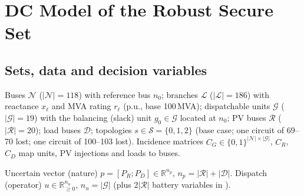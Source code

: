 
\section{DC Model of the Robust Secure Set}
\label{app:dc}

\subsection{Sets, data and decision variables}
Buses $\mathcal N$ ($|\mathcal N|=118$) with reference bus $n_0$; branches $\mathcal L$
($|\mathcal L|=186$) with reactance $x_\ell$ and MVA rating $r_\ell$ (p.u., base 100\,MVA);
dispatchable units $\mathcal G$ ($|\mathcal G|=19$) with the balancing (slack) unit
$g_0\in\mathcal G$ located at $n_0$; PV buses $\mathcal R$ ($|\mathcal R|=20$); load buses
$\mathcal D$; topologies $s\in\mathcal S=\{0,1,2\}$ (base case; one circuit of 69--70 lost;
one circuit of 100--103 lost). Incidence matrices $C_G\in\{0,1\}^{|\mathcal N|\times|\mathcal G|}$,
$C_R$, $C_D$ map units, PV injections and loads to buses.

Uncertain vector (nature) $p=[P_R;P_D]\in\mathbb R^{n_p}$, $n_p=|\mathcal R|+|\mathcal D|$.
Dispatch (operator) $u\in\mathbb R^{n_u}_{\ge 0}$, $n_u=|\mathcal G|$
(plus $2|\mathcal R|$ battery variables in ).

